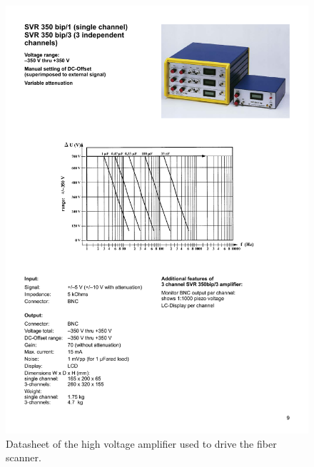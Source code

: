 \begin{figure}[h!]\centering \includegraphics[width=16cm]{appendix/driver.pdf}
      \caption{Datasheet of the high voltage amplifier used to drive the fiber scanner.}
\end{figure}
